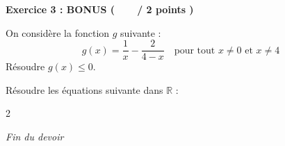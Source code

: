 \documentclass[12pt,a4paper]{exam}
\begin{document}
\vspace{10pt}

\noindent
\textbf{Exercice 3 : BONUS (\ \ \ \  / 2 points )}
\vspace{5pt}

\begin{questions}

\question[1] On considère la fonction $g$ suivante :
\[
g(x) = \dfrac{1}{x} - \dfrac{2}{4-x} \quad \text{pour tout $x \neq 0$ et $x \neq 4$}
\]
Résoudre $g(x) \leq 0$.

\vspace{5pt}

\question[1] Résoudre les équations suivante dans $\mathbb{R}$ :
\begin{multicols}{2}
\end{multicols}

\end{questions}

\vspace{10pt}

\begin{center}
    \textit{Fin du devoir}
\end{center}
\end{document}
